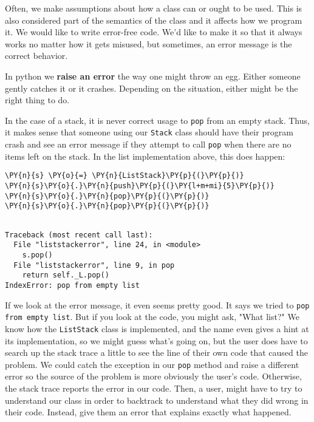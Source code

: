 Often, we make assumptions about how a class can or ought to be used.
This is also considered part of the semantics of the class and it affects how we program it.
We would like to write error-free code.
We'd like to make it so that it always works no matter how it gets misused, but sometimes, an error message is the correct behavior.


In python we \textbf{raise an error} the way one might throw an egg.
Either someone gently catches it or it crashes.
Depending on the situation, either might be the right thing to do.


In the case of a stack, it is never correct usage to \texttt{pop} from an empty stack.
Thus, it makes sense that someone using our \texttt{Stack} class should have their program crash and see an error message if they attempt to call \texttt{pop} when there are no items left on the stack.
In the list implementation above, this does happen:


\begin{Verbatim}[commandchars=\\\{\}]
\PY{n}{s} \PY{o}{=} \PY{n}{ListStack}\PY{p}{(}\PY{p}{)}
\PY{n}{s}\PY{o}{.}\PY{n}{push}\PY{p}{(}\PY{l+m+mi}{5}\PY{p}{)}
\PY{n}{s}\PY{o}{.}\PY{n}{pop}\PY{p}{(}\PY{p}{)}
\PY{n}{s}\PY{o}{.}\PY{n}{pop}\PY{p}{(}\PY{p}{)}
\end{Verbatim}

\begin{Verbatim}

Traceback (most recent call last):
  File "liststackerror", line 24, in <module>
    s.pop()
  File "liststackerror", line 9, in pop
    return self._L.pop()
IndexError: pop from empty list

\end{Verbatim}


If we look at the error message, it even seems pretty good.
It says we tried to \texttt{pop from empty list}.
But if you look at the code, you might ask, "What list?"
We know how the \texttt{ListStack} class is implemented, and the name even gives a hint at its implementation, so we might guess what's going on, but the user does have to search up the stack trace a little to see the line of their own code that caused the problem.
We could catch the exception in our \texttt{pop} method and raise a different error so the source of the problem is more obviously the user's code.
Otherwise, the stack trace reports the error in our code.
Then, a user, might have to try to understand our class in order to backtrack to understand what they did wrong in their code.
Instead, give them an error that explains exactly what happened.

